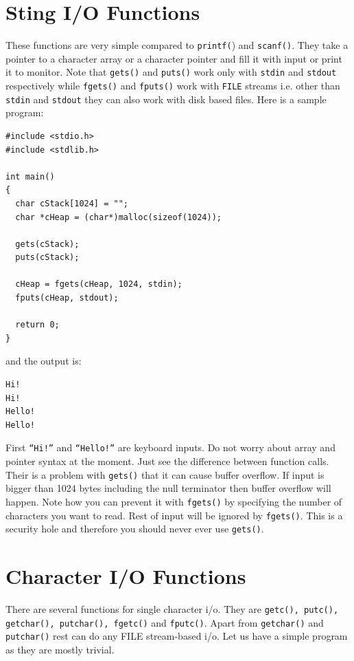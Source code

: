 \section{Sting I/O Functions}
These functions are very simple compared to \texttt{printf(}) and
\texttt{scanf()}. They take a pointer to a character array or a character
pointer and fill it with input or print it to monitor. Note that
\texttt{gets()} and \texttt{puts()} work only with \texttt{stdin} and
\texttt{stdout} respectively while \texttt{fgets()} and \texttt{fputs()} work
with \texttt{FILE} streams i.e. other than \texttt{stdin} and \texttt{stdout}
they can also work with disk based files. Here is a sample program:

\begin{Verbatim}[frame=single]
#include <stdio.h>
#include <stdlib.h>

int main()
{
  char cStack[1024] = "";
  char *cHeap = (char*)malloc(sizeof(1024));

  gets(cStack);
  puts(cStack);

  cHeap = fgets(cHeap, 1024, stdin);
  fputs(cHeap, stdout);

  return 0;
}
\end{Verbatim}

and the output is:

\begin{Verbatim}[frame=single]
Hi!
Hi!
Hello!
Hello!
\end{Verbatim}

First \texttt{``Hi!''} and \texttt{``Hello!''} are keyboard inputs. Do not
worry about array and pointer syntax at the moment. Just see the difference
between function calls. Their is a problem with \texttt{gets()} that it can
cause buffer overflow. If input is bigger than 1024 bytes including the null
terminator then buffer overflow will happen. Note how you can prevent it with
\texttt{fgets()} by specifying the number of characters you want to read. Rest
of input will be ignored by \texttt{fgets()}. This is a security hole and
therefore you should never ever use \texttt{gets()}.

\section{Character I/O Functions}
There are several functions for single character i/o. They are \texttt{getc(),
  putc(), getchar(), putchar(), fgetc()} and \texttt{fputc()}. Apart from
\texttt{getchar()} and \texttt{putchar()} rest can do any FILE stream-based
i/o. Let us have a simple program as they are mostly trivial.

